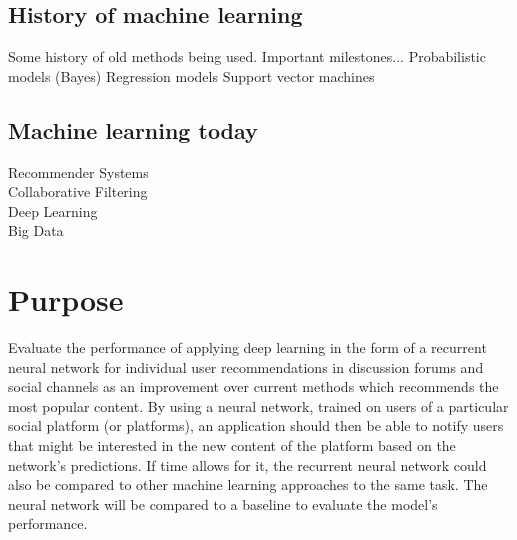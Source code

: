 \subsection{History of machine learning}%
Some history of old methods being used. Important milestones...
Probabilistic models (Bayes)
Regression models
Support vector machines

\subsection{Machine learning today} %
Recommender Systems\\
Collaborative Filtering\\
Deep Learning\\
Big Data\\

\section{Purpose}
Evaluate the performance of applying deep learning in the form of a recurrent neural network for individual user recommendations in discussion forums and social channels as an improvement over current methods which recommends the most popular content. By using a neural network, trained on users of a particular social platform (or platforms), an application should then be able to notify users that might be interested in the new content of the platform based on the network’s predictions. If time allows for it, the recurrent neural network could also be compared to other machine learning approaches to the same task. The neural network will be compared to a baseline to evaluate the model’s performance.

